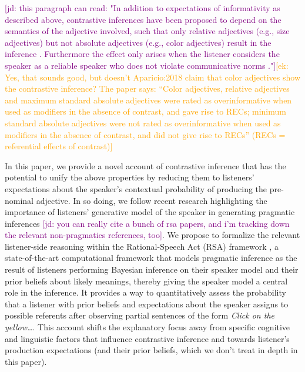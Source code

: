 \documentclass[10pt,letterpaper]{article}
\newcommand{\ek}[1]{\textcolor{Orange}{[ek: #1]}}
\newcommand{\jd}[1]{\textcolor{Purple}{[jd: #1]}}
\begin{document}
\jd{this paragraph can read: "In addition to expectations of informativity as described above, contrastive inferences have been proposed to depend on the semantics of the adjective involved, such that only relative adjectives (e.g., size adjectives) but not absolute adjectives (e.g., color adjectives) result in the inference \cite{Aparicio:2018}. Furthermore the effect only arises when the listener considers the speaker as a reliable speaker who does not violate communicative norms \cite{Grodner:2011,Ryskin:2019}."}\ek{Yes, that sounds good, but doesn't Aparicio:2018 claim that color adjectives show the contrastive inference? The paper says: ``Color adjectives, relative adjectives and maximum standard absolute adjectives were rated as overinformative when used as modifiers in the absence of contrast, and gave rise to RECs; minimum standard absolute adjectives were not rated as overinformative when used as modifiers in the absence of contrast, and did
not give rise to RECs'' (RECs = referential effects of contrast)}


In this paper, we provide a novel account of contrastive inference that has the potential to unify the above properties by reducing them to listeners' expectations about the speaker's contextual probability of producing the pre-nominal adjective. In so doing, we follow recent research highlighting the importance of listeners' generative model of the speaker in generating pragmatic inferences \cite{Hawkins:2018,Kao:2015,Kleinschmidt:2011,Rubio-Fernandez:2018}\jd{you can really cite a bunch of rsa papers, and i'm tracking down the relevant non-pragmatics references, too}. We propose to formalize the relevant listener-side reasoning within the Rational-Speech Act (RSA) framework \cite{Frank:2012, Goodman:2016}, a state-of-the-art computational framework that models pragmatic inference as the result of listeners performing Bayesian inference on their speaker model and their prior beliefs about likely meanings, thereby giving the speaker model a central role in the inference. It provides a way to quantitatively assess the probability that a listener with prior beliefs and expectations about the speaker assigns to possible referents after observing partial sentences of the form \emph{Click on the yellow\dots}. This account shifts the explanatory focus away from specific cognitive and linguistic factors that influence contrastive inference and towards listener's production expectations (and their prior beliefs, which we don't treat in depth in this paper).
\end{document}
